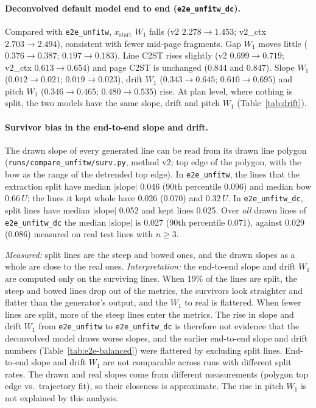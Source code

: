 \documentclass[11pt,a4paper]{article}
\newcommand{\U}{\ensuremath{U}}
\newcommand{\src}[1]{{\footnotesize\texttt{#1}}}
\begin{document}
\paragraph{Deconvolved default model end to end (\texttt{e2e\_unfitw\_dc}).}
Compared with \texttt{e2e\_unfitw}, $x_\text{start}$ $W_1$ falls (v2
$2.278\to1.453$; v2\_ctx $2.703\to2.494$), consistent with fewer mid-page
fragments. Gap $W_1$ moves little ($0.376\to0.387$; $0.197\to0.183$). Line
C2ST rises slightly (v2 $0.699\to0.719$; v2\_ctx $0.613\to0.654$) and page
C2ST is unchanged (0.844 and 0.847). Slope $W_1$ ($0.012\to0.021$;
$0.019\to0.023$), drift $W_1$ ($0.343\to0.645$; $0.610\to0.695$) and pitch
$W_1$ ($0.346\to0.465$; $0.480\to0.535$) rise. At plan level, where nothing
is split, the two models have the same slope, drift and pitch $W_1$
(Table~\ref{tab:drift}).

\paragraph{Survivor bias in the end-to-end slope and drift.} The drawn slope
of every generated line can be read from its drawn line polygon
(\src{runs/compare\_unfitw/surv.py}, method v2; top edge of the polygon, with
the bow as the range of the detrended top edge). In \texttt{e2e\_unfitw}, the
lines that the extraction split have median $|$slope$|$ 0.046 (90th percentile
0.096) and median bow $0.66\,\U$; the lines it kept whole have 0.026 (0.070)
and $0.32\,\U$. In \texttt{e2e\_unfitw\_dc}, split lines have median
$|$slope$|$ 0.052 and kept lines 0.025. Over \emph{all} drawn lines of
\texttt{e2e\_unfitw\_dc} the median $|$slope$|$ is 0.027 (90th percentile
0.071), against 0.029 (0.086) measured on real test lines with $n\ge3$.

\emph{Measured:} split lines are the steep and bowed ones, and the drawn
slopes as a whole are close to the real ones. \emph{Interpretation:} the
end-to-end slope and drift $W_1$ are computed only on the surviving lines.
When 19\% of the lines are split, the steep and bowed lines drop out of the
metrics, the survivors look straighter and flatter than the generator's
output, and the $W_1$ to real is flattered. When fewer lines are split, more
of the steep lines enter the metrics. The rise in slope and drift $W_1$ from
\texttt{e2e\_unfitw} to \texttt{e2e\_unfitw\_dc} is therefore not evidence
that the deconvolved model draws worse slopes, and the earlier end-to-end
slope and drift numbers (Table~\ref{tab:e2e-balanced}) were flattered by
excluding split lines. End-to-end slope and drift $W_1$ are not comparable
across runs with different split rates. The drawn and real slopes come from
different measurements (polygon top edge vs.\ trajectory fit), so their
closeness is approximate. The rise in pitch $W_1$ is not explained by this
analysis.
\end{document}
